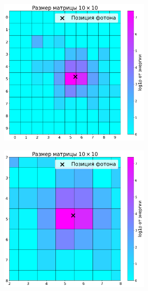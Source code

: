 \documentclass[a4paper,12pt]{extarticle}
\begin{document}
\begin{figure}[t]
    \centering
    \begin{subfigure}{0.5\textwidth}
        \centering
        \includegraphics[width=0.8\textwidth]{graphics/data_10x10.png}
    \end{subfigure}%
    \begin{subfigure}{0.5\textwidth}
        \centering
        \includegraphics[width=0.8\textwidth]{graphics/data_10x10_zoomed.png}
    \end{subfigure}


\end{figure}
\end{document}
